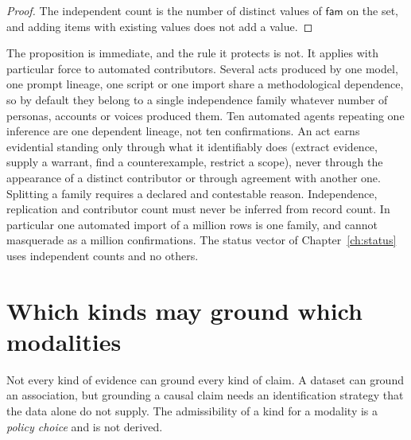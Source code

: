 \begin{proof}
The independent count is the number of distinct values of $\mathsf{fam}$ on the set, and adding items with existing values does not add a value.
\end{proof}

The proposition is immediate, and the rule it protects is not. It applies with particular force to automated contributors. Several acts produced by one model, one prompt lineage, one script or one import share a methodological dependence, so by default they belong to a single independence family whatever number of personas, accounts or voices produced them. Ten automated agents repeating one inference are one dependent lineage, not ten confirmations. An act earns evidential standing only through what it identifiably does (extract evidence, supply a warrant, find a counterexample, restrict a scope), never through the appearance of a distinct contributor or through agreement with another one. Splitting a family requires a declared and contestable reason. Independence, replication and contributor count must never be inferred from record count. In particular one automated import of a million rows is one family, and cannot masquerade as a million confirmations. The status vector of Chapter~\ref{ch:status} uses independent counts and no others.

\section{Which kinds may ground which modalities}

Not every kind of evidence can ground every kind of claim. A dataset can ground an association, but grounding a causal claim needs an identification strategy that the data alone do not supply. The admissibility of a kind for a modality is a \emph{policy choice} and is not derived.

